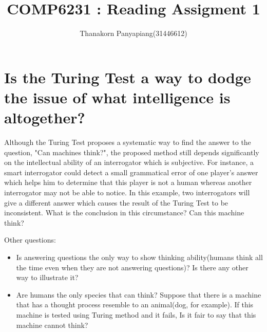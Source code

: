 \documentclass{article}
\title{COMP6231 : Reading Assigment 1}
\author{Thanakorn Panyapiang(31446612)}
\begin{document}
\maketitle
\section*{Is the Turing Test a way to dodge the issue of what intelligence is altogether?}

Although the Turing Test proposes a systematic way to find the answer to the question, "Can machines think?", the proposed method still depends significantly on the intellectual ability of an interrogator which is subjective. For instance, a smart interrogator could detect a small grammatical error of one player's answer which helps him to determine that this player is not a human whereas another interrogator may not be able to notice. In this example, two interrogators will give a different answer which causes the result of the Turing Test to be inconsistent. What is the conclusion in this circumstance? Can this machine think?

Other questions:
\begin{itemize}
\item Is answering questions the only way to show thinking ability(humans think all the time even when they are not answering questions)? Is there any other way to illustrate it?
\item Are humans the only species that can think? Suppose that there is a machine that has a thought process resemble to an animal(dog, for example). If this machine is tested using Turing method and it fails, Is it fair to say that this machine cannot think?
\end{itemize}
\end{document}
